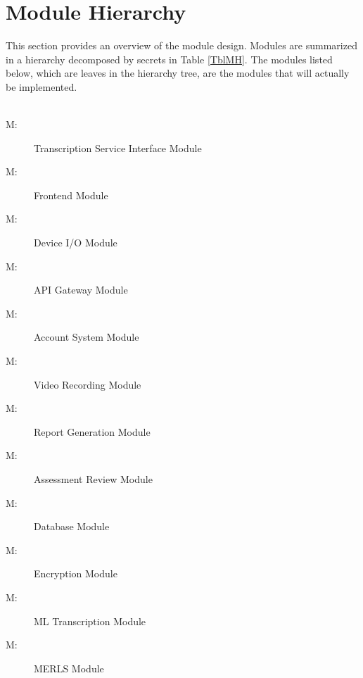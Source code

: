 \documentclass[12pt, titlepage]{article}
\newcounter{mnum}
\newcommand{\mthemnum}{M\themnum}
\begin{document}
\section{Module Hierarchy} \label{SecMH}

This section provides an overview of the module design. Modules are summarized
in a hierarchy decomposed by secrets in Table \ref{TblMH}. The modules listed
below, which are leaves in the hierarchy tree, are the modules that will
actually be implemented.
\\ \\ \indent
\begin{description}
\item [ \mthemnum \label{mTSI}:] Transcription Service Interface Module
\item [ \mthemnum \label{mFE}:] Frontend Module
\item [ \mthemnum \label{mDIO}:] Device I/O Module
\item [ \mthemnum \label{mAPI}:] API Gateway Module
\item [ \mthemnum \label{mAS}:] Account System Module
\item [ \mthemnum \label{mVR}:] Video Recording Module
\item [ \mthemnum \label{mRG}:] Report Generation Module
\item [ \mthemnum \label{mAR}:] Assessment Review Module
\item [ \mthemnum \label{mDB}:] Database Module
\item [ \mthemnum \label{mEnc}:] Encryption Module
\item [ \mthemnum \label{mML}:] ML Transcription Module
\item [ \mthemnum \label{mMERLS}:] MERLS Module
\end{description}
\end{document}
